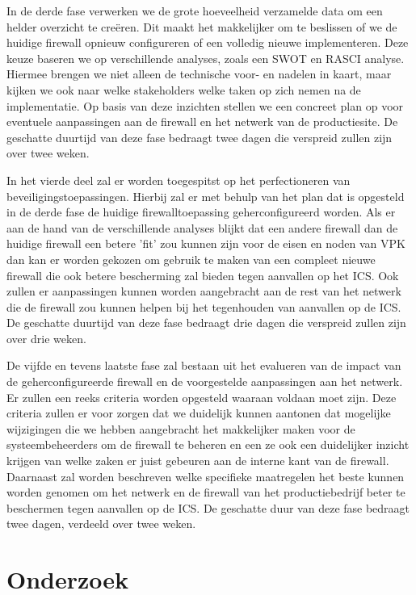 In de derde fase verwerken we de grote hoeveelheid verzamelde data om een helder overzicht te creëren. Dit maakt het makkelijker om te beslissen of we de huidige firewall opnieuw configureren of een volledig nieuwe implementeren. Deze keuze baseren we op verschillende analyses, zoals een SWOT en RASCI analyse. Hiermee brengen we niet alleen de technische voor- en nadelen in kaart, maar kijken we ook naar welke stakeholders welke taken op zich nemen na de implementatie. Op basis van deze inzichten stellen we een concreet plan op voor eventuele aanpassingen aan de firewall en het netwerk van de productiesite. De geschatte duurtijd van deze fase bedraagt twee dagen die verspreid zullen zijn over twee weken.

In het vierde deel zal er worden toegespitst op het perfectioneren van beveiligingstoepassingen. Hierbij zal er met behulp van het plan dat is opgesteld in de derde fase de huidige firewalltoepassing geherconfigureerd worden. Als er aan de hand van de verschillende analyses blijkt dat een andere firewall dan de huidige firewall een betere 'fit' zou kunnen zijn voor de eisen en noden van VPK dan kan er worden gekozen om gebruik te maken van een compleet nieuwe firewall die ook betere bescherming zal bieden tegen aanvallen op het ICS. Ook zullen er aanpassingen kunnen worden aangebracht aan de rest van het netwerk die de firewall zou kunnen helpen bij het tegenhouden van aanvallen op de ICS. De geschatte duurtijd van deze fase bedraagt drie dagen die verspreid zullen zijn over drie weken.

De vijfde en tevens laatste fase zal bestaan uit het evalueren van de impact van de geherconfigureerde firewall en de voorgestelde aanpassingen aan het netwerk. Er zullen een reeks criteria worden opgesteld waaraan voldaan moet zijn. Deze criteria zullen er voor zorgen dat we duidelijk kunnen aantonen dat mogelijke wijzigingen die we hebben aangebracht het makkelijker maken voor de systeembeheerders om de firewall te beheren en een ze ook een duidelijker inzicht krijgen van welke zaken er juist gebeuren aan de interne kant van de firewall. Daarnaast zal worden beschreven welke specifieke maatregelen het beste kunnen worden genomen om het netwerk en de firewall van het productiebedrijf beter te beschermen tegen aanvallen op de ICS. De geschatte duur van deze fase bedraagt twee dagen, verdeeld over twee weken.  

\chapter{Onderzoek}

